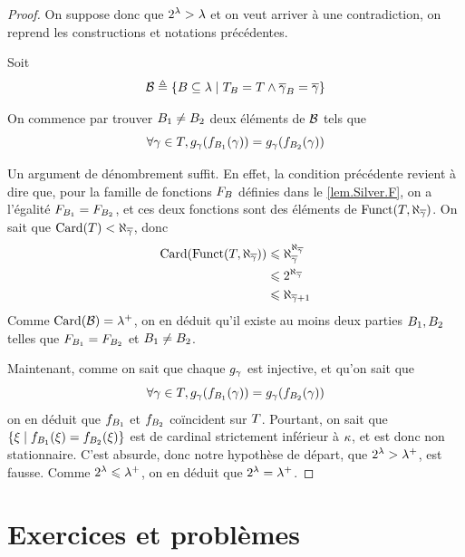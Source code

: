 \begin{proof}
  On suppose donc que $2^\lambda > \lambda$ et on veut arriver à une
  contradiction, on reprend les constructions et notations précédentes.

  Soit
  \[\mathcal{B} \triangleq \left\{ B\subseteq \lambda \;\middle\vert\; T_{B}=T\land
            \overline{\gamma}_{B}=\overline{\gamma} \right\}\]

  On commence par trouver $B_1\neq B_2$ deux éléments de $\mathcal{B}$
  tels que
  \[\forall \gamma \in T,
  g_\gamma(f_{B_1}(\gamma)) = g_\gamma(f_{B_2}(\gamma))\]

  Un argument de dénombrement suffit. En effet, la condition précédente revient
  à dire que, pour la famille de fonctions $F_{B}$ définies dans le
  \cref{lem.Silver.F}, on a l'égalité $F_{B_1} = F_{B_2}$, et ces deux
  fonctions sont des éléments de
  $\operatorname{Funct}(T,\aleph_{\overline{\gamma}})$. On sait que
  $\operatorname{Card}(T) < \aleph_{\overline{\gamma}}$, donc
  \begin{align*}
    \operatorname{Card}(\operatorname{Funct}(T,\aleph_{\overline{\gamma}})) &
    \leqslant \aleph_{\overline{\gamma}}^{\aleph_{\overline{\gamma}}}\\
    &\leqslant 2^{\aleph_{\overline{\gamma}}} \\
    &\leqslant \aleph_{\overline{\gamma} + 1}
  \end{align*}
  Comme $\operatorname{Card}(\mathcal{B}) = \lambda^{+}$, on en déduit qu'il existe au moins
  deux parties $B_1,B_2$ telles que
  $F_{B_1} = F_{B_2}$ et $B_1\neq B_2$.

  Maintenant, comme on sait que chaque $g_\gamma$ est injective, et qu'on sait
  que
  \[\forall \gamma\in T,
  g_\gamma(f_{B_1}(\gamma)) = g_\gamma(f_{B_2}(\gamma))\]
  on en déduit que $f_{B_1}$ et $f_{B_2}$ coïncident sur $T$.
  Pourtant, on sait que
  $\left\{ \xi \;\middle\vert\; f_{B_1}(\xi) = f_{B_2}(\xi) \right\}$ est de cardinal
  strictement inférieur à $\kappa$, et est donc non stationnaire. C'est absurde,
  donc notre hypothèse de départ, que $2^\lambda > \lambda^{+}$, est fausse.
  Comme $2^\lambda\leqslant\lambda^{+}$, on en déduit que $2^\lambda=\lambda^{+}$.
\end{proof}

\clearpage

\section{Exercices et problèmes}

